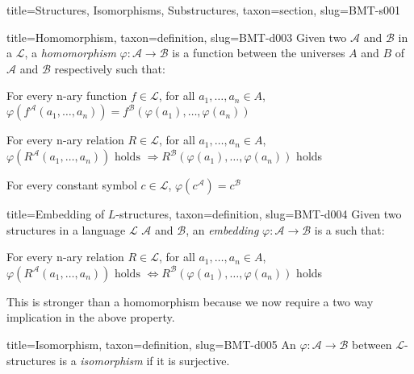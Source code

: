 \documentclass[a4paper]{article}
\begin{document}
\begin{tree}{title={Structures, Isomorphisms, Substructures}, taxon={section}, slug={BMT-s001}}
\begin{tree}{title={Homomorphism}, taxon={definition}, slug={BMT-d003}}
Given two  \(\mathcal {A}\) and \(\mathcal {B}\) in a  \(\mathcal {L}\), a \emph{homomorphism} \(\varphi :  \mathcal {A}  \rightarrow   \mathcal {B}\)
is a function between the universes \(A\) and \(B\) of \(\mathcal {A}\) and \(\mathcal {B}\) respectively such that:\par{ For every n-ary function \(f \in   \mathcal {L}\), for all \(a_1, \dots , a_n \in  A\), \(\varphi (f^{ \mathcal {A}}(a_1, \dots , a_n)) = f^{ \mathcal {B}}( \varphi (a_1), \dots ,  \varphi (a_n))\)}\par{For every n-ary relation \(R \in   \mathcal {L}\), for all \(a_1, \dots , a_n  \in  A\), \(\varphi (R^{ \mathcal {A}}(a_1, \dots , a_n))  \text { holds }  \Rightarrow  R^{ \mathcal {B}}( \varphi (a_1),  \dots ,  \varphi (a_n))\) holds}\par{For every constant symbol \(c  \in   \mathcal {L}\), \(\varphi (c^{ \mathcal {A}}) =c^{ \mathcal {B}}\)}
\end{tree}

\begin{tree}{title={Embedding of \(L\)-structures}, taxon={definition}, slug={BMT-d004}}
Given two structures in a language \(\mathcal {L}\) \(\mathcal {A}\) and \(\mathcal {B}\), an \emph{embedding} \(\varphi :  \mathcal {A}  \rightarrow   \mathcal {B}\)
is a  such that:\par{For every n-ary relation \(R \in   \mathcal {L}\), for all \(a_1, \dots , a_n  \in  A\), \(\varphi (R^{ \mathcal {A}}(a_1, \dots , a_n))  \text { holds }  \Leftrightarrow  R^{ \mathcal {B}}( \varphi (a_1),  \dots ,  \varphi (a_n))\) holds}\par{This is stronger than a homomorphism because we now require a two way implication in the above property.}
\end{tree}

\begin{tree}{title={Isomorphism}, taxon={definition}, slug={BMT-d005}}
An  \(\varphi :  \mathcal {A}  \rightarrow   \mathcal {B}\) between \(\mathcal {L}\)-structures is a \emph{isomorphism} if it is surjective.
\end{tree}


\end{tree}
\end{document}
